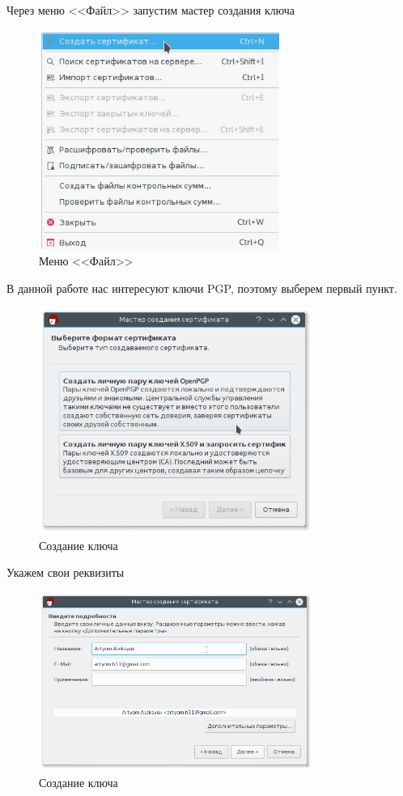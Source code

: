 Через меню <<Файл>> запустим мастер создания ключа

\begin{figure}[H]
	\centering
	\includegraphics[width=0.7\textwidth]{figures/screen2.png}
	\caption{Меню <<Файл>>}
\end{figure}

В данной работе нас интересуют ключи PGP, поэтому выберем первый пункт.

\begin{figure}[H]
	\centering
	\includegraphics[width=0.8\textwidth]{figures/screen3.png}
	\caption{Создание ключа}
\end{figure}

Укажем свои реквизиты

\begin{figure}[H]
	\centering
	\includegraphics[width=0.8\textwidth]{figures/screen4.png}
	\caption{Создание ключа}
\end{figure}


